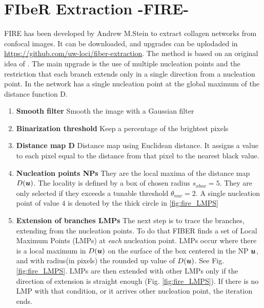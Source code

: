  
 
 
\section{FIbeR Extraction -FIRE-}

FIRE has been developed by Andrew M.Stein
  \citep{stein_mathematical_2007} to extract collagen networks from confocal
  images. It can be downloaded, and upgrades can be uplodaded in
  \url{https://github.com/uw-loci/fiber-extraction}. The method
  \citep{stein_algorithm_2008} is based on an original idea of
  \citet{wu_automated_2003}. The main upgrade is the use of multiple nucleation
  points   and the restriction that each branch extends only  in a single 
  direction from a nucleation point. In \citet{wu_automated_2003}  the network has a single nucleation point at the global maximum of the distance function D.


 \begin{enumerate}[label=\textbf{\Alph*}]
 
 \item \textbf{Smooth filter} Smooth the image with a Gaussian filter
 \item \textbf{Binarization threshold} Keep a percentage of the brightest pixels
 \item \textbf{Distance map D} Distance map using Euclidean distance. It
 assigns a value to each pixel equal to the distance from that pixel to the nearest black value.

 \item \textbf{Nucleation points NPs} They are the
 local maxima of the distance map $D(\boldsymbol{u})$. The locality is defined by a
 box of chosen radius $s_{xbox}=5$. They are only selected if they
 exceeds a tunable threshold $\theta_{nuc}=2$. A single nucleation point of
 value $4$ is denoted by the thick circle in \ref{fig:fire_LMPS}
 
 \item \textbf{Extension of branches LMPs} The next step is to trace the
 branches, extending from the nucleation points. To do that FIBER finds a set of
 Local Maximum Points (LMPs) at \emph{each} nucleation point. LMPs occur where
 there is a local maximum in $D(\boldsymbol{u})$ on the surface of the box centered in the NP
 $\boldsymbol{u}$, and with radius(in pixels) the rounded up value of $D(\boldsymbol{u})$.
 See Fig. \ref{fig:fire_LMPS}. LMPs are then extended with other
 LMPs only if the direction of extension is straight enough
 (Fig. \ref{fig:fire_LMPS}). If there is no LMP with that
 condition, or it arrives other nucleation point, the iteration ends.
 \end{enumerate} 
     


